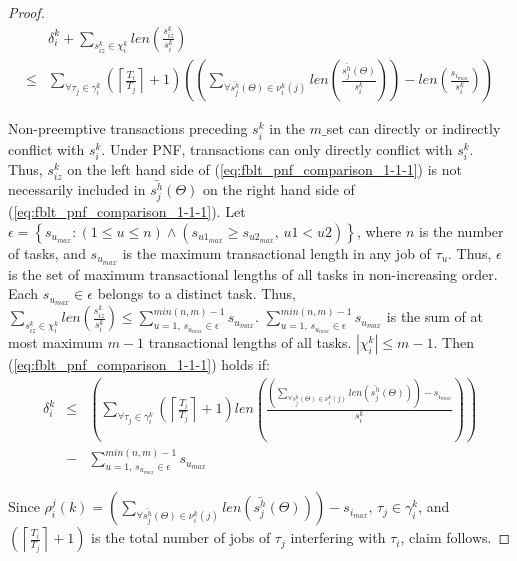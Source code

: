 \documentclass[prodmode,acmtecs]{acmsmall}
\begin{document}
\begin{compactenum}
\begin{proof}
\begin{eqnarray}
 & \delta_{i}^{k}+\sum_{s_{iz}^{k}\in\chi_{i}^{k}}len(\frac{s_{iz}^{k}}{s_{i}^{k}})\label{eq:fblt_pnf_comparison_1-1-1}\\
\le & \sum_{\forall\tau_{j}\in\gamma_{i}^{k}}\left(\left\lceil \frac{T_{i}}{T_{j}}\right\rceil +1\right)\left(\left(\sum_{\forall\bar{s_{j}^{h}}(\Theta)\in\nu_{i}^{k}(j)}len\left(\frac{\bar{s_{j}^{h}}(\Theta)}{s_{i}^{k}}\right)\right)-len\left(\frac{s_{i_{max}}}{s_{i}^{k}}\right)\right)\nonumber 
\end{eqnarray}

Non-preemptive transactions preceding $s_{i}^{k}$ in the $m\_$set can directly or indirectly  conflict with $s_{i}^{k}$. Under PNF, transactions can only directly conflict with $s_{i}^{k}$. Thus, $s_{iz}^{k}$ on the left hand side of (\ref{eq:fblt_pnf_comparison_1-1-1}) is
not necessarily included in $\bar{s_{j}^{h}}(\Theta)$ on the right
hand side of (\ref{eq:fblt_pnf_comparison_1-1-1}). Let $\epsilon=\left\{ s_{u_{max}}:(1\le u\le n)\wedge\left(s_{u1_{max}}\ge s_{u2_{max}},\, u1<u2\right)\right\} $,
where $n$ is the number of tasks, and $s_{u_{max}}$ is the maximum transactional
length in any job of $\tau_{u}$. Thus, $\epsilon$ is the set of
maximum transactional lengths of all tasks in non-increasing order.
Each $s_{u_{max}}\in\epsilon$ belongs to a distinct task. Thus, $\sum_{s_{iz}^{k}\in\chi_{i}^{k}}len\left(\frac{s_{iz}^{k}}{s_{i}^{k}}\right)\le\sum_{u=1,\, s_{u_{max}}\in\epsilon}^{min(n,m)-1}s_{u_{max}}$.
$\sum_{u=1,\, s_{u_{max}}\in\epsilon}^{min(n,m)-1}s_{u_{max}}$ is
the sum of at most maximum $m-1$ transactional lengths of all tasks.
$|\chi_{i}^{k}|\le m-1$. Then (\ref{eq:fblt_pnf_comparison_1-1-1})
holds if:
\begin{eqnarray*}
\delta_{i}^{k} & \le & \left(\sum_{\forall\tau_{j}\in\gamma_{i}^{k}}\left(\left\lceil \frac{T_{i}}{T_{j}}\right\rceil +1\right)len\left(\frac{\left(\sum_{\forall\bar{s_{j}^{h}}(\Theta)\in\nu_{i}^{k}(j)}len\left(\bar{s_{j}^{h}}(\Theta)\right)\right)-s_{i_{max}}}{s_{i}^{k}}\right)\right)\\
& - & \sum_{u=1,\, s_{u_{max}}\in\epsilon}^{min(n,m)-1}s_{u_{max}}\label{eq:fblt_pnf_comparison_1-1-1-1}
\end{eqnarray*}

Since $\rho_{i}^{j}(k)=\left(\sum_{\forall\bar{s_{j}^{h}}(\Theta)\in\nu_{i}^{k}(j)}len\left(\bar{s_{j}^{h}}(\Theta)\right)\right)-s_{i_{max}},\,\tau_{j}\in\gamma_{i}^{k}$,
and $\left(\left\lceil \frac{T_{i}}{T_{j}}\right\rceil +1\right)$
is the total number of jobs of $\tau_{j}$ interfering with $\tau_{i}$, claim follows.
\end{proof}



\end{compactenum}
\end{document}
